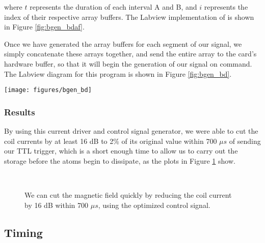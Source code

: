 \noindent
where $t$ represents the duration of each interval A and B, and $i$ represents the index of their respective array buffers.  The Labview implementation of  is shown in Figure \ref{fig:bgen_bdaf}.


 Once we have generated the array buffers for each segment of our signal, we simply concatenate these arrays together, and send the entire array to the card's  hardware buffer, so that it will begin the generation of our signal on command.  The Labview diagram for this program is shown in Figure \ref{fig:bgen_bd}.


\begin{sidewaysfigure}
 \centering  
 \texttt{[image: figures/bgen\_bd]} 
 \caption[B-Field generator Labview code]{Block diagram for Labview interface to used to generate the control signal} 
 \label{fig:bgen_bd} 
\end{sidewaysfigure}

\clearpage


\subsubsection{Results}

By using this current driver and control signal generator, we were able to cut the coil currents by at least 16 dB to 2\% of its original value within 700 $\mu s$ of sending our TTL trigger, which is a short enough time to allow us to carry out the storage before the atoms begin to dissipate, as the plots in Figure \ref{fig:bcurrent} show.

\begin{figure}[!htb]
  \centering
   \\
  \caption[Magnetic field extinction times]{We can cut the magnetic field quickly by reducing the coil current by 16 dB within 700 $\mu s$, using the optimized control signal.}
  \label{fig:bcurrent}
\end{figure}




\subsection{Timing} 

